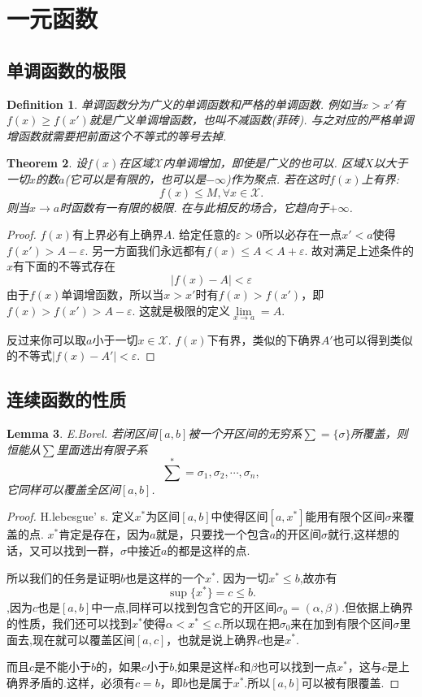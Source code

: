 \documentclass{article}
\newtheorem{theorem}{Theorem}[section]
\newtheorem{lemma}[theorem]{Lemma}
\newtheorem{definition}[theorem]{Definition}
\begin{document}
\newpage
\section{一元函数}
\subsection{单调函数的极限}

\begin{definition}
\rm 单调函数分为广义的单调函数和严格的单调函数. 例如当$x > x'$有$f(x) \geq f(x')$就是广义单调增函数，也叫不减函数(菲砖). 与之对应的严格单调增函数就需要把前面这个不等式的等号去掉.
\end{definition}


\begin{theorem}
\rm 设$f(x)$在区域$\mathcal{X}$内单调增加，即使是广义的也可以. 区域$X$以大于一切$x$的数$a$(它可以是有限的，也可以是$-\infty$)作为聚点. 若在这时$f(x)$上有界:
$$
	f(x) \leq M , \forall x \in \mathcal{X}.
$$
则当$x \rightarrow a$时函数有一有限的极限. 在与此相反的场合，它趋向于$+\infty$.
\end{theorem}

\begin{proof}
$f(x)$有上界必有上确界$A$. 给定任意的$\varepsilon > 0$所以必存在一点$x'<a$使得$f(x') > A-\varepsilon$. 另一方面我们永远都有$f(x) \leq A < A+\varepsilon.$ 故对满足上述条件的$x$有下面的不等式存在
$$
	|f(x)-A| < \varepsilon 
$$
由于$f(x)$单调增函数，所以当$x >x'$时有$f(x)>f(x')$，即$f(x) > f(x') > A-\varepsilon$. 这就是极限的定义$\lim\limits_{x \rightarrow a} = A$.

反过来你可以取$a$小于一切$x \in \mathcal{X}$. $f(x)$下有界，类似的下确界$A'$也可以得到类似的不等式$|f(x)-A'| < \varepsilon$.
\end{proof}

\newpage
\subsection{连续函数的性质}
\begin{lemma}
\rm E.Borel. 若闭区间$[a,b]$被一个开区间的无穷系$\sum = \{\sigma\}$所覆盖，则恒能从$\sum$里面选出有限子系\[\sum^{*} = {\sigma_1,\sigma_2,\cdots,\sigma_n},\]它同样可以覆盖全区间$[a,b]$.
\end{lemma}

\begin{proof}
\rm H.lebesgue' s. 定义$x^*$为区间$[a,b]$中使得区间$[a,x^*]$能用有限个区间$\sigma$来覆盖的点. $x^*$肯定是存在，因为$a$就是，只要找一个包含$a$的开区间$\sigma$就行,这样想的话，又可以找到一群，$\sigma$中接近$a$的都是这样的点.

所以我们的任务是证明$b$也是这样的一个$x^*$.
因为一切$x^* \leq b$,故亦有\[\sup\{x^*\}=c \leq b.\],因为$c$也是$[a,b]$中一点,同样可以找到包含它的开区间$\sigma_0=(\alpha,\beta)$.但依据上确界的性质，我们还可以找到$x^*$使得$\alpha < x^* \leq c$.所以现在把$\sigma_0$来在加到有限个区间$\sigma$里面去,现在就可以覆盖区间$[a,c]$，也就是说上确界$c$也是$x^*$.

而且$c$是不能小于$b$的，如果$c$小于$b$,如果是这样$c$和$\beta$也可以找到一点$x^*$，这与$c$是上确界矛盾的.这样，必须有$c=b$，即$b$也是属于$x^*$.所以$[a,b]$可以被有限覆盖.
\end{proof}
\end{document}
